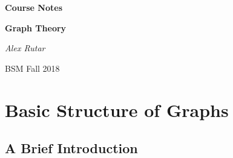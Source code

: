 \documentclass[12pt, a4paper]{book}
\theoremstyle{nonumberplain}
\newcommand{\assignmentname}{Course Notes}
\newcommand{\classname}{Graph Theory}
\newcommand{\semester}{BSM Fall 2018}
\begin{document}
\begin{titlepage}
    \centering
    \vspace{5cm}
    {\huge\textbf{\assignmentname}\par} %
    \vspace{2cm}
    {\Large\textbf{\classname}\par} %
    \vspace{3cm}
    {\Large\textit{Alex Rutar}\par}

    \vfill

    {\large \semester \par} %
\end{titlepage}
\tableofcontents
{}
\chapter{Basic Structure of Graphs}
\section{A Brief Introduction}
\end{document}
